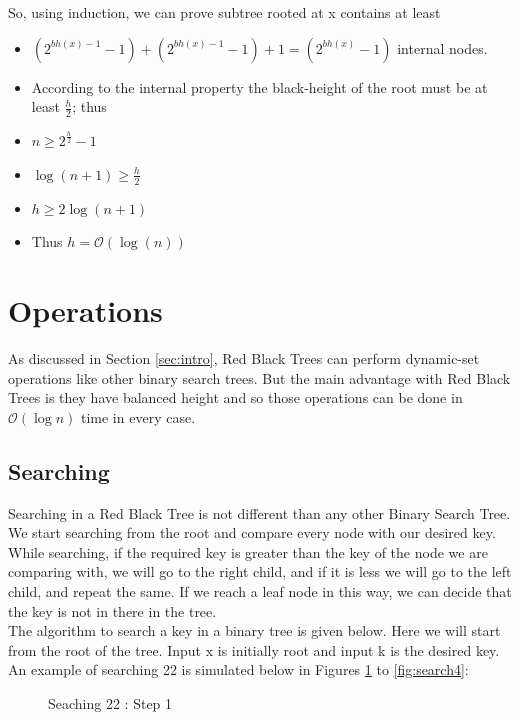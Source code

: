 \documentclass{article}[10pt]
\begin{document}
    
    
    
 So, using induction, we can prove subtree rooted at x contains at least 
 \begin{itemize}
     \item $(2^{bh(x)-1}-1) + (2^{bh(x)-1}-1) + 1 = (2^{bh(x)} -1)$ internal nodes.
    \item According to the internal property the black-height of the root must be at least $\frac{h}{2}$; thus
    \item  $n \geqslant 2^{\frac{h}{2}}-1$
	\item  $\log(n+1) \geqslant \frac{h}{2}$
	\item $h \geqslant 2\log(n+1)$	
	\item Thus $h = \mathcal{O}(\log(n))$
    \end{itemize}        


\section{Operations}
As discussed in Section \ref{sec:intro}, Red Black Trees can perform dynamic-set operations like other binary search trees. But the main advantage with Red Black Trees is they have balanced height and so those operations can be done in $\mathcal{O}(\log n)$ time in every case.

\subsection{Searching}
Searching in a Red Black Tree is not different than any other Binary Search Tree. We start searching from the root and compare every node with our desired key. While searching, if the required key is greater than the key of the node we are comparing with, we will go to the right child, and if it is less we will go to the left child, and repeat the same. If we reach a leaf node in this way, we can decide that the key is not in there in the tree.\\ 
The algorithm to search\cite{introAlgo} a key in a binary tree is given below. Here we will start from the root of the tree. Input x is initially root and input k is the desired key.\\



An example of searching 22 is simulated below in Figures \ref{fig:search1} to \ref{fig:search4}:\\

\begin{figure}[htbp]
	\centering
	
	\caption{Seaching 22 : Step 1} 
	\label{fig:search1}
\end{figure}
\end{document}
